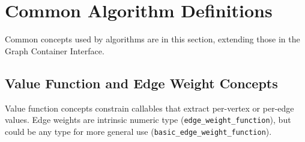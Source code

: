 

\clearpage
\section{Common Algorithm Definitions}






Common concepts used by algorithms are in this section, extending those in the Graph Container Interface.

\subsection{Value Function and Edge Weight Concepts}

Value function concepts constrain callables that extract per-vertex or per-edge values.
Edge weights are intrinsic numeric type (\lstinline{edge_weight_function}), but could be any type 
for more general use (\lstinline{basic_edge_weight_function}).

